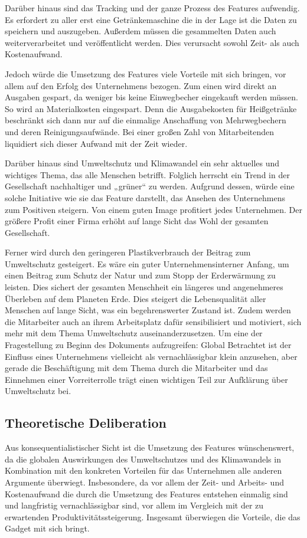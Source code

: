 \documentclass[a4paper,12pt,]{article}
\begin{document}
Darüber hinaus sind das Tracking und der ganze Prozess des Features aufwendig. Es erfordert zu aller erst eine Getränkemaschine die in der Lage ist die Daten zu speichern und auszugeben. Außerdem müssen die gesammelten Daten auch weiterverarbeitet und veröffentlicht werden. Dies verursacht sowohl Zeit- als auch Kostenaufwand.

Jedoch würde die Umsetzung des Features viele Vorteile mit sich bringen, vor allem auf den Erfolg des Unternehmens bezogen.
Zum einen wird direkt an Ausgaben gespart, da weniger bis keine Einwegbecher eingekauft werden müssen. So wird an Materialkosten eingespart. Denn die Ausgabekosten für Heißgetränke beschränkt sich dann nur auf die einmalige Anschaffung von Mehrwegbechern und deren Reinigungsaufwände. Bei einer großen Zahl von Mitarbeitenden liquidiert sich dieser Aufwand mit der Zeit wieder.

Darüber hinaus sind Umweltschutz und Klimawandel ein sehr aktuelles und wichtiges Thema, das alle Menschen betrifft. Folglich herrscht ein Trend in der Gesellschaft nachhaltiger und „grüner“ zu werden. Aufgrund dessen, würde eine solche Initiative wie sie das Feature darstellt, das Ansehen des Unternehmens zum Positiven steigern. Von einem guten Image profitiert jedes Unternehmen. Der größere Profit einer Firma erhöht auf lange Sicht das Wohl der gesamten Gesellschaft.

Ferner wird durch den geringeren Plastikverbrauch der Beitrag zum Umweltschutz gesteigert. Es wäre ein guter Unternehmensinterner Anfang, um einen Beitrag zum Schutz der Natur und zum Stopp der Erderwärmung zu leisten. Dies sichert der gesamten Menschheit ein längeres und angenehmeres Überleben auf dem Planeten Erde. Dies steigert die Lebensqualität aller Menschen auf lange Sicht, was ein begehrenswerter Zustand ist. Zudem werden die Mitarbeiter auch an ihrem Arbeitsplatz dafür sensibilisiert und motiviert, sich mehr mit dem Thema Umweltschutz auseinanderzusetzen.
Um eine der Fragestellung zu Beginn des Dokuments aufzugreifen: Global Betrachtet ist der Einfluss eines Unternehmens vielleicht als vernachlässigbar klein anzusehen, aber gerade die Beschäftigung mit dem Thema durch die Mitarbeiter und das Einnehmen einer Vorreiterrolle trägt einen wichtigen Teil zur Aufklärung über Umweltschutz bei.

\subsection{Theoretische Deliberation}
Aus konsequentialistischer Sicht ist die Umsetzung des Features wünschenswert, da die globalen Auswirkungen des Umweltschutzes und des Klimawandels in Kombination mit den konkreten Vorteilen für das Unternehmen alle anderen Argumente überwiegt. Insbesondere, da vor allem der Zeit- und Arbeits- und Kostenaufwand die durch die Umsetzung des Features entstehen einmalig sind und langfristig ver­nach­läs­sig­bar sind, vor allem im Vergleich mit der zu erwartenden Produktivitätssteigerung. Insgesamt überwiegen die Vorteile, die das Gadget mit sich bringt.
\end{document}
